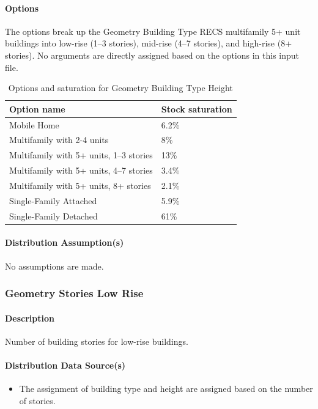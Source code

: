 \paragraph{Options}
The options break up the Geometry Building Type RECS multifamily 5+ unit buildings into low-rise (1--3 stories), mid-rise (4--7 stories), and high-rise (8+ stories). No arguments are directly assigned based on the options in this input file. 

\begin{longtable}[]{@{}ll@{}}
\caption{Options and saturation for Geometry Building Type Height} \\
\toprule\noalign{}
Option name & Stock saturation \\
\midrule\noalign{}
\endhead
\bottomrule\noalign{}
\endlastfoot
Mobile Home & 6.2\% \\
Multifamily with 2-4 units & 8\% \\
Multifamily with 5+ units, 1--3 stories & 13\% \\
Multifamily with 5+ units, 4--7 stories & 3.4\% \\
Multifamily with 5+ units, 8+ stories & 2.1\% \\
Single-Family Attached & 5.9\% \\
Single-Family Detached & 61\% \\
\end{longtable}

\paragraph{Distribution Assumption(s)}
No assumptions are made.

\subsubsection{Geometry Stories Low Rise}
\paragraph{Description}
Number of building stories for low-rise buildings.

\paragraph{Distribution Data Source(s)}
\begin{itemize}
    \item The assignment of building type and height are assigned based on the number of stories.
\end{itemize}

